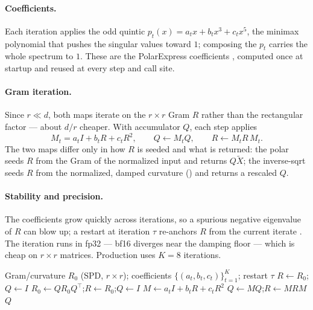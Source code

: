 \documentclass[11pt]{article}
\newcommand{\polar}{\varphi}                 %
\theoremstyle{plain}
\theoremstyle{definition}
\theoremstyle{remark}
\begin{document}
\paragraph{Coefficients.} Each iteration applies the odd quintic
$p_t(x)=a_t x+b_t x^3+c_t x^5$, the minimax polynomial that pushes the singular values
toward $1$; composing the $p_t$ carries the whole spectrum to $1$. These are the
PolarExpress coefficients \cite{polarexpress}, computed once at startup and reused at
every step and call site.

\paragraph{Gram iteration.} Since $r\ll d$, both maps iterate on the $r\times r$ Gram
$R$ rather than the rectangular factor \cite{gram_ns} --- about $d/r$ cheaper. With
accumulator $Q$, each step applies
\begin{equation*}
  M_t=a_t I+b_t R+c_t R^2,\qquad Q\gets M_t Q,\qquad R\gets M_t R\,M_t .
\end{equation*}
The two maps differ only in how $R$ is seeded and what is returned: the polar seeds
$R$ from the Gram of the normalized input and returns $Q\tilde X$; the inverse-sqrt
seeds $R$ from the normalized, damped curvature () and returns a
rescaled $Q$.

\paragraph{Stability and precision.} The coefficients grow quickly across iterations,
so a spurious negative eigenvalue of $R$ can blow up; a restart at iteration $\tau$
re-anchors $R$ from the current iterate \cite{gram_ns}. The iteration runs in fp32 ---
bf16 diverges near the damping floor --- which is cheap on $r\times r$ matrices.
Production uses $K{=}8$ iterations.

\begin{algorithm}[h]
\caption{Gram Newton--Schulz (shared by $\polar$ and the inverse-sqrt)}
\label{alg:gramns}
\begin{algorithmic}[1]
\Require Gram/curvature $R_0$ (SPD, $r\times r$); coefficients $\{(a_t,b_t,c_t)\}_{t=1}^{K}$; restart $\tau$
\State $R\gets R_0$;\quad $Q\gets I$
   \State $R_0\gets Q R_0 Q^\top$;\quad $R\gets R_0$;\quad $Q\gets I$  \EndIf
  \State $M\gets a_t I+b_t R+c_t R^2$
  \State $Q\gets M Q$;\quad $R\gets M R M$
\EndFor
\State \Return $Q$ 
\end{algorithmic}
\end{algorithm}
\end{document}
